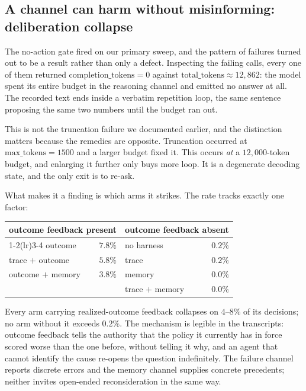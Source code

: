 \documentclass[11pt]{article}
\begin{document}
\subsection{A channel can harm without misinforming: deliberation collapse}
\label{sec:collapse}

The no-action gate fired on our primary sweep, and the pattern of failures turned out to be a
result rather than only a defect. Inspecting the failing calls, every one of them returned
$\text{completion\_tokens}=0$ against $\text{total\_tokens}\approx 12{,}862$: the model spent its
entire budget in the reasoning channel and emitted no answer at all. The recorded text ends inside a
verbatim repetition loop, the same sentence proposing the same two numbers until the budget ran out.

This is not the truncation failure we documented earlier, and the distinction matters because the
remedies are opposite. Truncation occurred at $\text{max\_tokens}=1500$ and a larger budget fixed it.
This occurs \emph{at} a $12{,}000$-token budget, and enlarging it further only buys more loop. It is
a degenerate decoding state, and the only exit is to re-ask.

What makes it a finding is which arms it strikes. The rate tracks exactly one factor:

\begin{center}\small
\begin{tabular}{@{}lr@{\hspace{2em}}lr@{}}
\toprule
\multicolumn{2}{c}{outcome feedback present} & \multicolumn{2}{c}{outcome feedback absent} \\
\cmidrule(lr){1-2}\cmidrule(lr){3-4}
outcome & $7.8\%$ & no harness & $0.2\%$ \\
trace $+$ outcome & $5.8\%$ & trace & $0.2\%$ \\
outcome $+$ memory & $3.8\%$ & memory & $0.0\%$ \\
& & trace $+$ memory & $0.0\%$ \\
\bottomrule
\end{tabular}
\end{center}

Every arm carrying realized-outcome feedback collapses on $4$--$8\%$ of its decisions; no arm without
it exceeds $0.2\%$. The mechanism is legible in the transcripts: outcome feedback tells the authority
that the policy it currently has in force scored worse than the one before, without telling it why,
and an agent that cannot identify the cause re-opens the question indefinitely. The failure channel
reports discrete errors and the memory channel supplies concrete precedents; neither invites
open-ended reconsideration in the same way.
\end{document}
